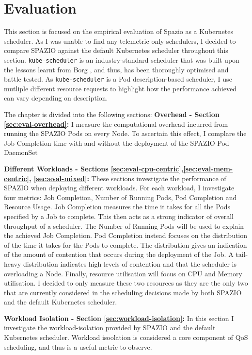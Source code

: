 \chapter{Evaluation}

This section is focused on the empirical evaluation of Spazio as a Kubernetes
scheduler. As I was unable to find any telemetric-only schedulers, I decided to
compare SPAZIO against the default Kubernetes scheduler throughout this section.
\texttt{kube-scheduler} is an industry-standard scheduler that was built upon
the lessons learnt from Borg \cite{}, and thus, has been thoroughly optimised
and battle tested. As \texttt{kube-scheduler} is a Pod description-based
scheduler, I use mutliple different resource requests to highlight how the
performance achieved can vary depending on description.

The chapter is divided into the following sections:
\textbf{Overhead - Section \ref{sec:eval-overhead}:} I measure the computational overhead
incurred from running the SPAZIO Pods on every Node. To ascertain this effect, I
complare the Job Completion time with and without the deployment of the SPAZIO
Pod DaemonSet

\textbf{Different Workloads - Sections
\ref{sec:eval-cpu-centric},\ref{sec:eval-mem-centric}, \ref{sec:eval-mixed}:}
These sections investigate the performance of SPAZIO when deploying different
workloads. For each workload, I investigate four metrics: Job Completion, Number
of Running Pods, Pod Completion and Resource Usage. Job Completion measures the
time it takes for all the Pods specified by a Job to complete. This then acts as
a strong indicator of overall throughput of a scheduler. The Number of Running
Pods will be used to explain the achieved Job Completion. Pod Completion instead
focuses on the distribution of the time it takes for the Pods to complete. The
distribution gives an indication of the amount of contention that occurs during
the deployment of the Job. A tail-heavy distribution indicates high levels of
contention and that the scheduler is overloading a Node. Finally, resource
utilisation will focus on CPU and Memory utilisation. I decided to only measure
these two resources as they are the only two that are currently considered in
the scheduling decisions made by both SPAZIO and the default Kubernetes
scheduler.

\textbf{Workload Isolation - Section \ref{sec:workload-isolation}:} In this
section I investigate the workload-isolation provided by SPAZIO and the default
Kubernetes scheduler. Workload isoolation is considered a core component of QoS
scheduling, and thus is a useful metric to observe.

